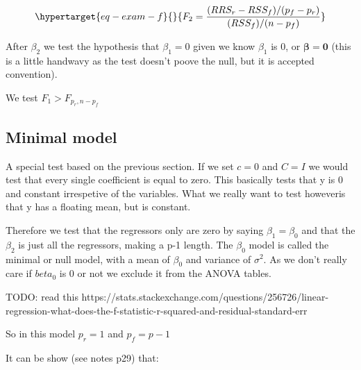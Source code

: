 \documentclass[
  letterpaper,
  DIV=11,
  numbers=noendperiod]{scrreprt}
\begin{document}
\begin{equation}\protect\hypertarget{eq-exam-f}{}{F_2 = \frac{(RRS_r - RSS_f) / (p_f - p_r)}{(RSS_f)/(n-p_f)}}\label{eq-exam-f}\end{equation}

After \(\beta_2\) we test the hypothesis that \(\beta_1=0\) given we
know \(\beta_1\) is 0, or \(\boldsymbol{\beta}=\textbf{0}\) (this is a
little handwavy as the test doesn't poove the null, but it is accepted
convention).

We test \(F_1 > F_{p_r, n-p_f}\)

\hypertarget{minimal-model}{%
\subsection{Minimal model}\label{minimal-model}}

A special test based on the previous section. If we set \(c=0\) and
\(C=I\) we would test that every single coefficient is equal to zero.
This basically tests that y is 0 and constant irrespetive of the
variables. What we really want to test howeveris that y has a floating
mean, but is constant.

Therefore we test that the regressors only are zero by saying
\(\beta_1 = \beta_0\) and that the \(\beta_2\) is just all the
regressors, making a p-1 length. The \(\beta_0\) model is called the
minimal or null model, with a mean of \(\beta_0\) and variance of
\(\sigma^2\). As we don't really care if \(beta_0\) is 0 or not we
exclude it from the ANOVA tables.

TODO: read this
https://stats.stackexchange.com/questions/256726/linear-regression-what-does-the-f-statistic-r-squared-and-residual-standard-err

So in this model \(p_r=1\) and \(p_f = p-1\)

It can be show (see notes p29) that:
\end{document}
